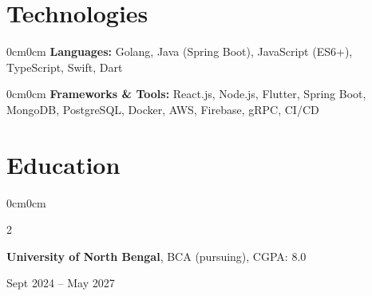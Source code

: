 \documentclass[10pt, letterpaper]{article}
\newenvironment{onecolentry}{\begin{adjustwidth}{0cm}{0cm}}{\end{adjustwidth}}
\newenvironment{twocolentry}[2][]{
    \onecolentry
    \def\secondColumn{#2}
    \setcolumnwidth{\fill, 4.2cm}
    \begin{paracol}{2}
}{
    \switchcolumn \raggedleft \secondColumn
    \end{paracol}
    \endonecolentry
}
\begin{document}
\vspace{-0.2cm}
\section{Technologies}
\begin{onecolentry}
    \textbf{Languages:} Golang, Java (Spring Boot), JavaScript (ES6+), TypeScript, Swift, Dart
\end{onecolentry}
\begin{onecolentry}
    \textbf{Frameworks \& Tools:} React.js, Node.js, Flutter, Spring Boot, MongoDB, PostgreSQL, Docker, AWS, Firebase, gRPC, CI/CD
\end{onecolentry}

\vspace{-0.2cm}
\section{Education}
\begin{twocolentry}{Sept 2024 – May 2027}
    \textbf{University of North Bengal}, BCA (pursuing), CGPA: 8.0
\end{twocolentry}
\end{document}
